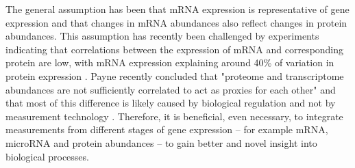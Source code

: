 The general assumption has been that mRNA expression is representative of gene
expression and that changes in mRNA abundances also reflect changes in protein
abundances. This assumption has recently been challenged by experiments
indicating that correlations between the expression of mRNA and corresponding
protein are low, with mRNA expression explaining around 40\% of variation in
protein expression \citep{Vogel2012}.
Payne recently concluded that "proteome and transcriptome
abundances are not sufficiently correlated to act as proxies for each other"
and that most of this difference is likely caused by biological regulation and
not by measurement technology \cite{Payne2015}.
Therefore, it is beneficial, even necessary, to integrate measurements from
different stages of gene expression -- for example mRNA, microRNA and protein
abundances -- to gain better and novel insight into biological processes.



